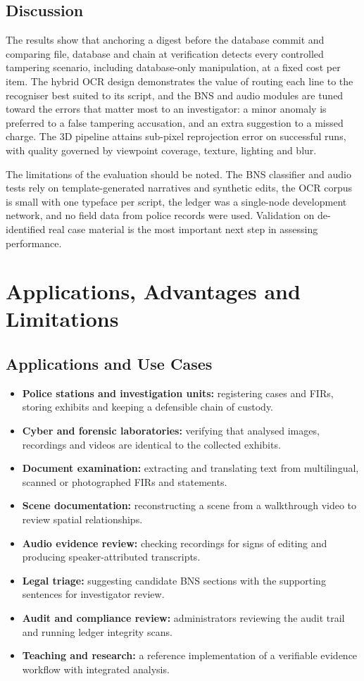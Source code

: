 \documentclass[12pt,a4paper,oneside]{report}
\begin{document}
\section{Discussion}
The results show that anchoring a digest before the database commit and comparing file, database and chain at verification detects every controlled tampering scenario, including database-only manipulation, at a fixed cost per item. The hybrid OCR design demonstrates the value of routing each line to the recogniser best suited to its script, and the BNS and audio modules are tuned toward the errors that matter most to an investigator: a minor anomaly is preferred to a false tampering accusation, and an extra suggestion to a missed charge. The 3D pipeline attains sub-pixel reprojection error on successful runs, with quality governed by viewpoint coverage, texture, lighting and blur.

The limitations of the evaluation should be noted. The BNS classifier and audio tests rely on template-generated narratives and synthetic edits, the OCR corpus is small with one typeface per script, the ledger was a single-node development network, and no field data from police records were used. Validation on de-identified real case material is the most important next step in assessing performance.

\chapter{Applications, Advantages and Limitations}
\section{Applications and Use Cases}
\begin{itemize}
  \item \textbf{Police stations and investigation units:} registering cases and FIRs, storing exhibits and keeping a defensible chain of custody.
  \item \textbf{Cyber and forensic laboratories:} verifying that analysed images, recordings and videos are identical to the collected exhibits.
  \item \textbf{Document examination:} extracting and translating text from multilingual, scanned or photographed FIRs and statements.
  \item \textbf{Scene documentation:} reconstructing a scene from a walkthrough video to review spatial relationships.
  \item \textbf{Audio evidence review:} checking recordings for signs of editing and producing speaker-attributed transcripts.
  \item \textbf{Legal triage:} suggesting candidate BNS sections with the supporting sentences for investigator review.
  \item \textbf{Audit and compliance review:} administrators reviewing the audit trail and running ledger integrity scans.
  \item \textbf{Teaching and research:} a reference implementation of a verifiable evidence workflow with integrated analysis.
\end{itemize}
\end{document}
